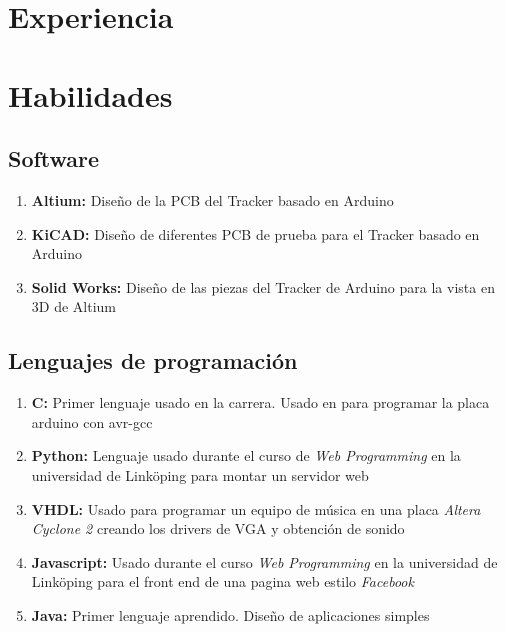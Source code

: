 \documentclass[letterpaper]{twentysecondcv-esp} %
\begin{document}

\section{Experiencia}

\begin{twenty} %

\end{twenty}

\section{Habilidades}
\subsection{Software}
\begin{enumerate}
	\item \textbf{Altium:} Diseño de la PCB del Tracker basado en Arduino
	\item \textbf{KiCAD:} Diseño de diferentes PCB de prueba para el Tracker basado en Arduino
	\item \textbf{Solid Works:} Diseño de las piezas del Tracker de Arduino para la vista en 3D de Altium
\end{enumerate}

\subsection{Lenguajes de programación}
\begin{enumerate}
	\item \textbf{C:} Primer lenguaje usado en la carrera. Usado en para programar la placa arduino con avr-gcc
	\item \textbf{Python:} Lenguaje usado durante el curso de {\it Web Programming} en la universidad de Link\"oping para montar un servidor web
	\item \textbf{VHDL:} Usado para programar un equipo de música en una placa {\it Altera Cyclone 2} creando los drivers de VGA y obtención de sonido
	\item \textbf{Javascript: } Usado durante el curso {\it Web Programming} en la universidad de Link\"oping para el front end de una pagina web estilo {\it Facebook}
	\item \textbf{Java: } Primer lenguaje aprendido. Diseño de aplicaciones simples
\end{enumerate}
\end{document}
